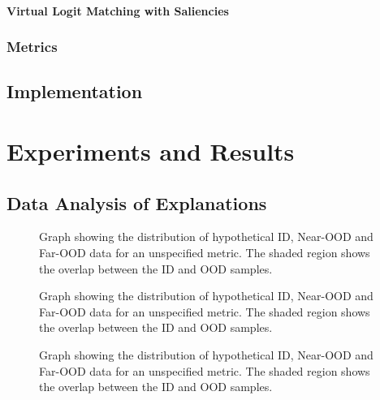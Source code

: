 \documentclass[UKenglish]{uiomasterthesis} %
\theoremstyle{definition}
\begin{document}
\subsubsection{Virtual Logit Matching with Saliencies}

\subsection{Metrics}

\section{Implementation}

\chapter{Experiments and Results} \label{chapter:experiments}

\section{Data Analysis of Explanations}

\begin{figure}
    \label{fig:lime}
    \begin{center}
        
    \end{center}
    \caption[Hypothetical ID/OOD distributions for an OOD detection metric]{Graph showing the distribution of hypothetical ID, Near-OOD and Far-OOD data for an unspecified metric. The shaded region shows the overlap between the ID and OOD samples.}
\end{figure}

\begin{figure}
    \label{fig:lime}
    \begin{center}
        
    \end{center}
    \caption[Hypothetical ID/OOD distributions for an OOD detection metric]{Graph showing the distribution of hypothetical ID, Near-OOD and Far-OOD data for an unspecified metric. The shaded region shows the overlap between the ID and OOD samples.}
\end{figure}


\begin{figure}
    \label{fig:gradcam}
    \begin{center}
        
    \end{center}
    \caption[Hypothetical ID/OOD distributions for an OOD detection metric]{Graph showing the distribution of hypothetical ID, Near-OOD and Far-OOD data for an unspecified metric. The shaded region shows the overlap between the ID and OOD samples.}
\end{figure}
\end{document}
